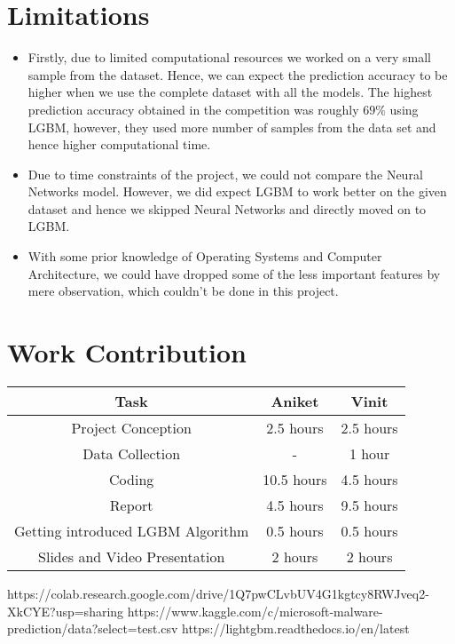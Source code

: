 \documentclass[conference]{IEEEtran}
\begin{document}
\section{Limitations}
\begin{itemize}
    \item Firstly, due to limited computational resources we worked on a very small sample from the dataset. Hence, we can expect the prediction accuracy to be higher when we use the complete dataset with all the models. The highest prediction accuracy obtained in the competition was roughly $69 \%$ using LGBM, however, they used more number of samples from the data set and hence higher computational time.
    \item Due to time constraints of the project, we could not compare the Neural Networks model. However, we did expect LGBM to work better on the given dataset and hence we skipped Neural Networks and directly moved on to LGBM.
    \item With some prior knowledge of Operating Systems and Computer Architecture, we could have dropped some of the less important features by mere observation, which couldn't be done in this project.
\end{itemize}


\section{Work Contribution}
\begin{table}[H]
    \centering
    \begin{tabular}{|c|c|c|}
        \hline
        Task                              & Aniket     & Vinit     \\ \hline
        Project Conception                & 2.5 hours  & 2.5 hours \\
        Data Collection                   & -          & 1 hour    \\
        Coding                            & 10.5 hours & 4.5 hours \\
        Report                            & 4.5 hours  & 9.5 hours \\
        Getting introduced LGBM Algorithm & 0.5 hours  & 0.5 hours \\
        Slides and Video Presentation     & 2 hours    & 2 hours   \\
        \hline
    \end{tabular}
\end{table}
\begin{thebibliography}{00}
     https://colab.research.google.com/drive/1Q7pwCLvbUV4G1kgtcy8RWJveq2-XkCYE?usp=sharing
     https://www.kaggle.com/c/microsoft-malware-prediction/data?select=test.csv
     https://lightgbm.readthedocs.io/en/latest
\end{thebibliography}
\end{document}
